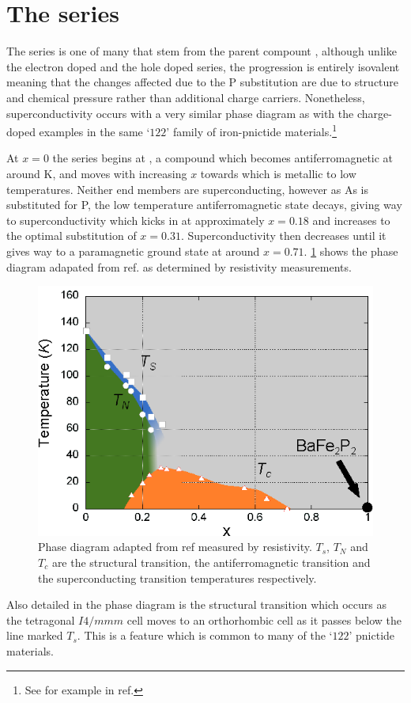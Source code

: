 
\section{The \BaFePAs series}

The \BaFePAs series is one of many that stem from the parent compount \BaFeAs, although unlike the electron doped \BaCoFeAs and the hole doped \BaKFeAs series, the \BaFePAs progression is entirely isovalent meaning that the changes affected due to the P substitution are due to structure and chemical pressure rather than additional charge carriers. Nonetheless, superconductivity occurs with a very similar phase diagram as with the charge-doped examples in the same `$122$' family of iron-pnictide materials.\footnote{See for example  in ref.\cite{Paglione2010}}

At $x=0$ the \BaFePAs series begins at \BaFeAs, a compound which becomes antiferromagnetic at around \unit[138]{K}, and moves with increasing $x$ towards \BaFeP which is metallic to low temperatures. Neither end members are superconducting, however as As is substituted for P, the low temperature antiferromagnetic state decays, giving way to superconductivity which kicks in at approximately $x=0.18$ and increases to the optimal substitution of $x=0.31$. Superconductivity then decreases until it gives way to a paramagnetic ground state at around $x=0.71$. \Fig\ref{Fig:3:PhaseDiagram} shows the phase diagram adapated from ref. \cite{Nakai2010a} as determined by resistivity measurements. 
\begin{figure}
    \begin{center}
        \includegraphics[scale=1.0]{Chapter3-dHvABaFe2P2/Figures/BaFe2P2Series/PhaseDiagram/PhaseDiagram}
        \caption{Phase diagram adapted from ref \cite{Nakai2010a} measured by resistivity. $T_s$, $T_N$ and $T_c$ are the structural transition, the antiferromagnetic transition and the superconducting transition temperatures respectively.}
        \label{Fig:3:PhaseDiagram}
    \end{center}
\end{figure}
Also detailed in the phase diagram is the structural transition which occurs as the tetragonal $I4/mmm$ cell moves to an orthorhombic cell as it passes below the line marked $T_s$. This is a feature which is common to many of the `$122$' pnictide materials.


